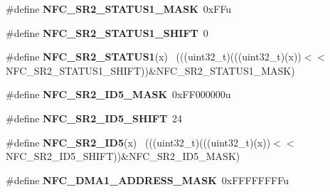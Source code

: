 \begin{DoxyCompactItemize}
\item 
\hypertarget{group___n_f_c___register___masks_ga29a9816d6fcf3b1848ed8a8df254ce54}{}\#define {\bfseries N\+F\+C\+\_\+\+S\+R2\+\_\+\+S\+T\+A\+T\+U\+S1\+\_\+\+M\+A\+S\+K}~0x\+F\+Fu\label{group___n_f_c___register___masks_ga29a9816d6fcf3b1848ed8a8df254ce54}

\item 
\hypertarget{group___n_f_c___register___masks_ga4da3bc669805b069788dcf7518652653}{}\#define {\bfseries N\+F\+C\+\_\+\+S\+R2\+\_\+\+S\+T\+A\+T\+U\+S1\+\_\+\+S\+H\+I\+F\+T}~0\label{group___n_f_c___register___masks_ga4da3bc669805b069788dcf7518652653}

\item 
\hypertarget{group___n_f_c___register___masks_gae3c0cdc8f4d6b6450bd8e9b26c3b76e8}{}\#define {\bfseries N\+F\+C\+\_\+\+S\+R2\+\_\+\+S\+T\+A\+T\+U\+S1}(x)                                          ~(((uint32\+\_\+t)(((uint32\+\_\+t)(x))$<$$<$N\+F\+C\+\_\+\+S\+R2\+\_\+\+S\+T\+A\+T\+U\+S1\+\_\+\+S\+H\+I\+F\+T))\&N\+F\+C\+\_\+\+S\+R2\+\_\+\+S\+T\+A\+T\+U\+S1\+\_\+\+M\+A\+S\+K)\label{group___n_f_c___register___masks_gae3c0cdc8f4d6b6450bd8e9b26c3b76e8}

\item 
\hypertarget{group___n_f_c___register___masks_gac81931c68decd88026b32956a7b421b6}{}\#define {\bfseries N\+F\+C\+\_\+\+S\+R2\+\_\+\+I\+D5\+\_\+\+M\+A\+S\+K}~0x\+F\+F000000u\label{group___n_f_c___register___masks_gac81931c68decd88026b32956a7b421b6}

\item 
\hypertarget{group___n_f_c___register___masks_ga0b7da9e03ce359a8d7fee312da65f7b3}{}\#define {\bfseries N\+F\+C\+\_\+\+S\+R2\+\_\+\+I\+D5\+\_\+\+S\+H\+I\+F\+T}~24\label{group___n_f_c___register___masks_ga0b7da9e03ce359a8d7fee312da65f7b3}

\item 
\hypertarget{group___n_f_c___register___masks_gaf72ee55c401c0988eedeac6f923b0bca}{}\#define {\bfseries N\+F\+C\+\_\+\+S\+R2\+\_\+\+I\+D5}(x)                                                  ~(((uint32\+\_\+t)(((uint32\+\_\+t)(x))$<$$<$N\+F\+C\+\_\+\+S\+R2\+\_\+\+I\+D5\+\_\+\+S\+H\+I\+F\+T))\&N\+F\+C\+\_\+\+S\+R2\+\_\+\+I\+D5\+\_\+\+M\+A\+S\+K)\label{group___n_f_c___register___masks_gaf72ee55c401c0988eedeac6f923b0bca}

\item 
\hypertarget{group___n_f_c___register___masks_ga652168fdc551b970c06555a2149fb1ad}{}\#define {\bfseries N\+F\+C\+\_\+\+D\+M\+A1\+\_\+\+A\+D\+D\+R\+E\+S\+S\+\_\+\+M\+A\+S\+K}~0x\+F\+F\+F\+F\+F\+F\+F\+Fu\label{group___n_f_c___register___masks_ga652168fdc551b970c06555a2149fb1ad}


\end{DoxyCompactItemize}
